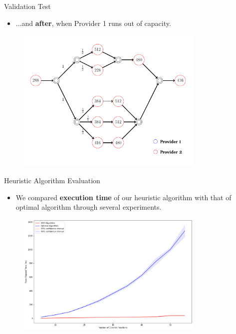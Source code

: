 \documentclass[13.5pt]{beamer}
\newcommand{\B}[1]{\textcolor{TorVergataColor}{\textbf{#1}}}
\begin{document}
\begin{frame}{Validation Test}
	
	\begin{itemize}
		\item ...and \B{after}, when Provider 1 runs out of capacity.
	\end{itemize}
	
	\begin{figure}[h]
		\centering
		\includegraphics[width=0.8\textwidth,height=0.55\columnwidth]{../Images/EXP2ForSlide.png}
	\end{figure}
	
	
\end{frame}


\begin{frame}{Heuristic Algorithm Evaluation}
	
\begin{itemize}
	\item We compared \B{execution time} of our heuristic algorithm with that of optimal algorithm through several experiments.
\end{itemize}
	
	\begin{figure}[h]
		\centering
		\includegraphics[width=0.8\textwidth,height=0.55\columnwidth]{../Images/ACOvsOptimalIncreasingConcrete.png}
	\end{figure}

\end{frame}
\end{document}
